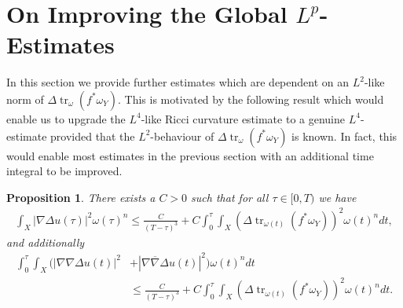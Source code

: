 \documentclass[12pt]{article}
\newtheorem{proposition}[theorem]{Proposition}
\numberwithin{equation}{section}
\DeclareMathOperator{\tr}{tr}
\newcommand{\oo}[1]{\overline{#1}}
\begin{document}
\section{On Improving the Global $L^p$-Estimates}

In this section we provide further estimates which are dependent on an $L^2$-like norm of $\Delta \tr_\omega (f^*\omega_Y)$. This is motivated by the following result which would enable us to upgrade the $L^4$-like Ricci curvature estimate to a genuine $L^4$-estimate provided that the $L^2$-behaviour of $\Delta \tr_\omega(f^*\omega_Y)$ is known. In fact, this would enable most estimates in the previous section with an additional time integral to be improved.

\begin{proposition}
There exists a $C > 0$ such that for all $\tau \in [0,T)$ we have
\begin{align*}
    \int_X |\nabla \Delta u (\tau)|^2 \omega(\tau)^n \leq \frac{C}{(T-\tau)^3} + C \int_0^\tau \int_X (\Delta \tr_{\omega(t)} (f^*\omega_Y))^2 \omega(t)^n dt,
\end{align*}
and additionally
\begin{align*}
    \int_0^\tau \int_X (|\nabla \nabla \Delta u(t)|^2 &+ |\nabla \oo{\nabla} \Delta u(t)|^2) \omega(t)^n dt\\
    &\leq \frac{C}{(T-\tau)^3} + C \int_0^\tau \int_X (\Delta \tr_{\omega(t)} (f^*\omega_Y))^2 \omega(t)^n dt.
\end{align*}
\end{proposition}
\end{document}
